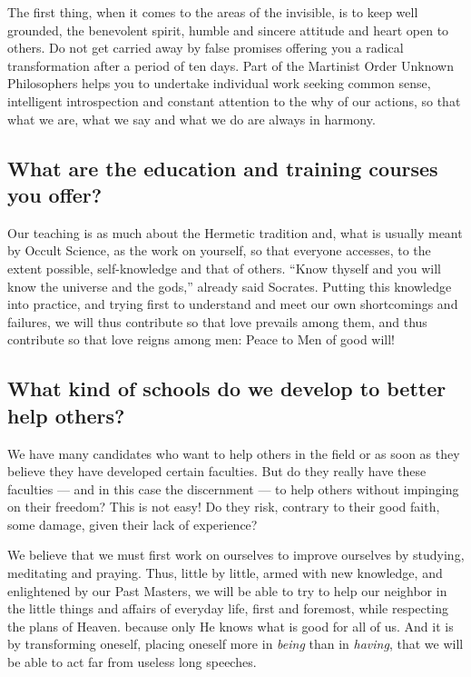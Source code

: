 The first thing, when it comes to the areas of the invisible, is to keep well grounded, the
benevolent spirit, humble and sincere attitude and heart open to others. Do not get carried
away by false promises offering you a radical transformation after a period of ten days. Part
of the Martinist Order Unknown Philosophers helps you to undertake individual work
seeking common sense, intelligent introspection and constant attention to the why of our
actions, so that what we are, what we say and what we do are always in harmony.

\subsection*{What are the education and training courses you offer?}

Our teaching is as much about the Hermetic tradition and, what is usually meant by Occult
Science, as the work on yourself, so that everyone accesses, to the extent possible, self-knowledge and that of others. ``Know thyself and you will know the universe and the gods,''
already said Socrates. Putting this knowledge into practice, and trying first to understand
and meet our own shortcomings and failures, we will thus contribute so that love prevails
among them, and thus contribute so that love reigns among men: Peace to Men of good will!

\subsection*{What kind of schools do we develop to better help others?}

We have many candidates who want to help others in the field or as soon as they believe
they have developed certain faculties. But do they really have these faculties --- and in this
case the discernment --- to help others without impinging on their freedom? This is not
easy! Do they risk, contrary to their good faith, some damage, given their lack of
experience?

We believe that we must first work on ourselves to improve ourselves by studying, meditating and praying. Thus, little by little, armed with new knowledge, and enlightened by our Past Masters, we will be able to try to help our neighbor in the little things and affairs of everyday life, first and foremost, while respecting the plans of Heaven. because only He knows what is good for all of us. And it is by transforming oneself, placing oneself more in \textit{being} than in \textit{having}, that we will be able to act far from useless long speeches.